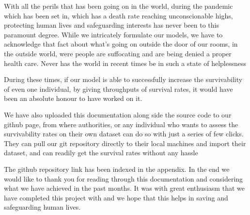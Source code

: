 \documentclass[12pt]{article}
\newcommand{\nd}{\noindent}
\begin{document}
\nd With all the perils that has been going on in the world, during the pandemic which has been set in, which has a death rate reaching unconscionable highs, protecting human lives and safeguarding interests has never been to this paramount degree. While we intricately formulate our models, we have to acknowledge that fact about what's going on outside the door of our rooms, in the outside world, were people are suffocating and are being denied a proper health care. Never has the world in recent times be in such a state of helplessness 

\nd During these times, if our model is able to successfully increase the survivability of even one individual, by giving throughputs of survival rates, it would have been an absolute honour to have worked on it. 

\nd We have also uploaded this documentation along side the source code to our github page, from where authorities, or any individual who wants to assess the survivability rates on their own dataset can do so with just a series of few clicks. They can pull our git repository directly to their local machines and import their dataset, and can readily get the survival rates without any hassle 

\nd The github repository link has been indexed in the appendix. In the end we would like to thank you for reading through this documentation and considering what we have achieved in the past months. It was with great enthusiasm that we have completed this project with and we hope that this helps in saving and safeguarding human lives. 
\end{document}
